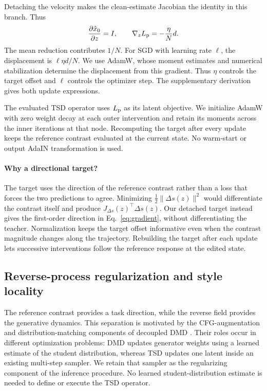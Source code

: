 Detaching the velocity makes the clean-estimate Jacobian the identity in
this branch. Thus
\begin{equation}
\frac{\partial\hat x_0}{\partial z}=I,
\qquad \nabla_z L_{\rm p}=-\frac{\eta}{N}d.
\label{eq:gradient}
\end{equation}
The mean reduction contributes $1/N$. For SGD with learning rate $\ell$,
the displacement is $\ell\eta d/N$. We use AdamW, whose moment estimates
and numerical stabilization determine the displacement from this gradient.
Thus $\eta$ controls the target offset and $\ell$ controls the optimizer
step. The supplementary derivation gives both update expressions.

The evaluated TSD operator uses $L_{\rm p}$ as its latent objective.
We initialize AdamW with zero weight decay at each outer intervention and
retain its moments across the inner iterations at that node. Recomputing
the target after every update keeps the reference contrast evaluated at
the current state. No warm-start or output AdaIN transformation is used.

\paragraph{Why a directional target?}
The target uses the direction of the reference contrast rather than a loss
that forces the two predictions to agree. Minimizing
$\frac12\|\Delta s(z)\|^2$ would differentiate the contrast itself and
produce $J_{\Delta s}(z)^\top\Delta s(z)$. Our detached target instead gives
the first-order direction in Eq.~\ref{eq:gradient}, without differentiating
the teacher. Normalization keeps the target offset informative even when
the contrast magnitude changes along the trajectory. Rebuilding the target
after each update lets successive interventions follow the reference
response at the edited state.

\subsection{Reverse-process regularization and style locality}
\label{sec:schedule}
The reference contrast provides a task direction, while the reverse field
provides the generative dynamics. This separation is motivated by the
CFG-augmentation and distribution-matching components of decoupled DMD
\citep{liu2025decoupled}. Their roles occur in different optimization
problems: DMD updates generator weights using a learned estimate of the
student distribution, whereas TSD updates one latent inside an existing
multi-step sampler. We retain that sampler as the regularizing component
of the inference procedure. No learned student-distribution estimate is
needed to define or execute the TSD operator.

